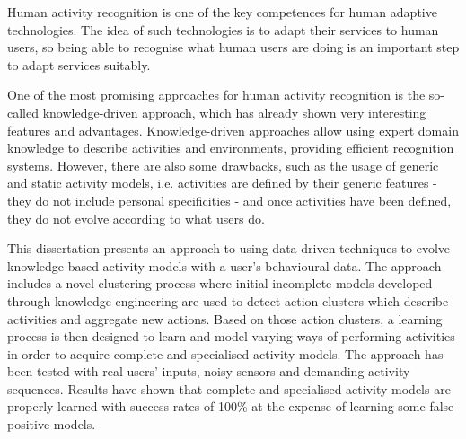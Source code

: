 




\begin{abstracts}        %

Human activity recognition is one of the key competences for human adaptive technologies. The idea of such technologies is to adapt their services to human users, so being able to recognise what human users are doing is an important step to adapt services suitably. 

One of the most promising approaches for human activity recognition is the so-called knowledge-driven approach, which has already shown very interesting features and advantages. Knowledge-driven approaches allow using expert domain knowledge to describe activities and environments, providing efficient recognition systems. However, there are also some drawbacks, such as the usage of generic and static activity models, i.e. activities are defined by their generic features - they do not include personal specificities - and once activities have been defined, they do not evolve according to what users do.

This dissertation presents an approach to using data-driven techniques to evolve knowledge-based activity models with a user's behavioural data. The approach includes a novel clustering process where initial incomplete models developed through knowledge engineering are used to detect action clusters which describe activities and aggregate new actions. Based on those action clusters, a learning process is then designed to learn and model varying ways of performing activities in order to acquire complete and specialised activity models. The approach has been tested with real users' inputs, noisy sensors and demanding activity sequences. Results have shown that complete and specialised activity models are properly learned with success rates of 100\% at the expense of learning some false positive models.

\end{abstracts}

